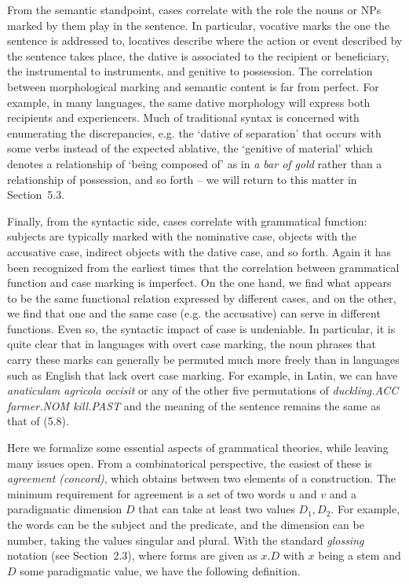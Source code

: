 From the semantic standpoint, cases correlate with the role the nouns or NPs
marked by them play in the sentence. In particular, vocative marks the one the
sentence is addressed to, locatives describe where the action or event
described by the sentence takes place, the dative is associated to the
recipient or beneficiary, the instrumental to instruments, and genitive to
possession.  The correlation between morphological marking and semantic
content is far from perfect. For example, in many languages, the same dative
morphology will express both recipients and experiencers. Much of traditional
syntax is concerned with enumerating the discrepancies, e.g. the `dative of
separation' that occurs with some verbs instead of the expected ablative, the
`genitive of material' which denotes a relationship of `being composed of' as
in {\it a bar of gold} rather than a relationship of possession, and so forth
-- we will return to this matter in Section~5.3.

Finally, from the syntactic side, cases correlate with grammatical function:
subjects are typically marked with the nominative case, objects with the
accusative case, indirect objects with the dative case, and so forth.  Again it
has been recognized from the earliest times that the correlation between
grammatical function and case marking is imperfect. On the one hand, we find
what appears to be the same functional relation expressed by different cases,
and on the other, we find that one and the same case (e.g. the accusative) can
serve in different functions. Even so, the syntactic impact of case is
undeniable. In particular, it is quite clear that in languages with overt case
marking, the noun phrases that carry these marks can generally be permuted much
more freely than in languages such as English that lack overt case marking. For
example, in Latin, we can have {\it anaticulam agricola occisit} or any of the
other five permutations of {\it duckling.ACC farmer.NOM kill.PAST} and the
meaning of the sentence remains the same as that of (5.8). 

Here we formalize some essential aspects of grammatical theories, while
leaving many issues open. From a combinatorical perspective, the easiest of
these is {\it agreement (concord)}, which obtains between two elements of a
construction.    The minimum
requirement for agreement is a set of two words $u$ and $v$ and a paradigmatic
dimension $D$ that can take at least two values $D_1, D_2$.  For example, the
words can be the subject and the predicate, and the dimension can be number,
taking the values singular and plural. With the standard {\it glossing}
notation (see Section~2.3), where forms are given as $x.D$ with $x$ being a
stem and $D$ some paradigmatic value, we have the following definition.

